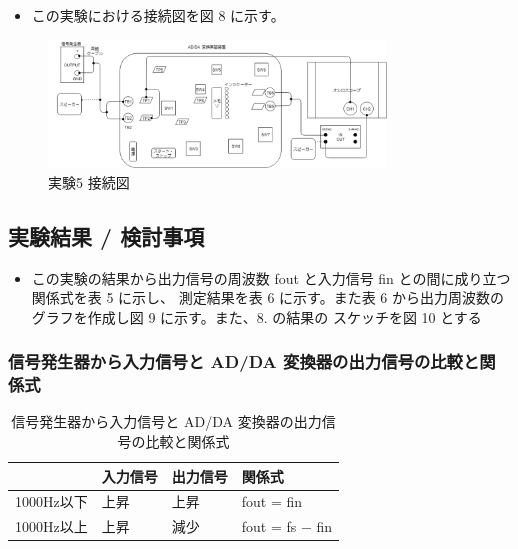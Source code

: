 \documentclass[10pt]{article}
\begin{document}
\begin{itemize}
    \item この実験における接続図を図 8 に示す。 
\end{itemize}

\begin{figure}[H]
		\centering
		\includegraphics[width=0.8\textwidth]{exp5.png}
		\caption{実験5 接続図}
	\end{figure}

\subsection{実験結果 / 検討事項}

\begin{itemize}
    \item この実験の結果から出力信号の周波数 fout と入力信号 fin との間に成り立つ関係式を表 5 に示し、 測定結果を表 6 に示す。また表 6 から出力周波数のグラフを作成し図 9 に示す。また、8. の結果の スケッチを図 10 とする
\end{itemize}

\subsubsection{信号発生器から入力信号と AD/DA 変換器の出力信号の比較と関係式 }

\begingroup
\setlength{\tabcolsep}{5pt} %
\renewcommand{\arraystretch}{1.5} %
\begin{table}[H]
    \centering
	\caption{信号発生器から入力信号と AD/DA 変換器の出力信号の比較と関係式}
	\begin{tabular}{|l|l|l|l|}
	    \hline
	     & 入力信号 & 出力信号 & 関係式 \\[0.5ex]
		\hline\hline
		 1000Hz以下 & 上昇 & 上昇 & fout = fin \\ \hline
		 1000Hz以上 & 上昇 & 減少 & fout = fs $-$ fin \\ \hline
	\end{tabular}
\end{table} 
\endgroup
\end{document}
